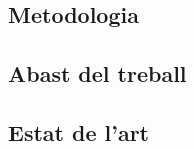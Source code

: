 \documentclass[12pt,a4paper,final,twoside]{article}
\begin{document}
\subsection{Metodologia}
\label{Metodologia}


\subsection{Abast del treball}
\label{Abast}


\subsection{Estat de l'art}
\label{Estat-de-l'art}


\end{document}
